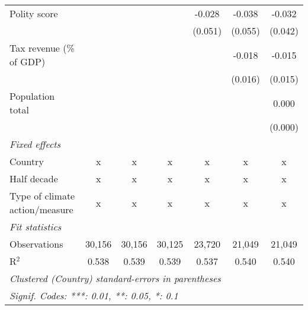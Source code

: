 \begin{tabular}{lcccccc}
   Polity score                                                                &         &              &               & -0.028        & -0.038        & -0.032\\   
                                                                               &         &              &               & (0.051)       & (0.055)       & (0.042)\\   
   Tax revenue (\% of GDP)                                                     &         &              &               &               & -0.018        & -0.015\\   
                                                                               &         &              &               &               & (0.016)       & (0.015)\\   
   Population total                                                            &         &              &               &               &               & 0.000\\   
                                                                               &         &              &               &               &               & (0.000)\\   
   \emph{Fixed effects}\\
   Country                                                                     & x       & x            & x             & x             & x             & x\\  
   Half decade                                                                 & x       & x            & x             & x             & x             & x\\  
   Type of climate action/measure                                              & x       & x            & x             & x             & x             & x\\  
   \midrule \emph{Fit statistics}\\
   Observations                                                                & 30,156  & 30,156       & 30,125        & 23,720        & 21,049        & 21,049\\  
   R$^2$                                                                       & 0.538   & 0.539        & 0.539         & 0.537         & 0.540         & 0.540\\  
   \midrule
   \multicolumn{7}{l}{\emph{Clustered (Country) standard-errors in parentheses}}\\
   \multicolumn{7}{l}{\emph{Signif. Codes: ***: 0.01, **: 0.05, *: 0.1}}\\
\end{tabular}
\par\endgroup


